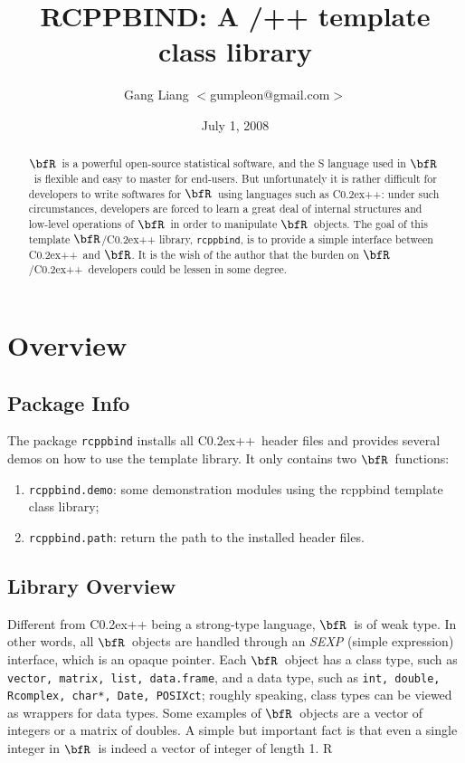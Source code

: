\documentclass{article}
\title{RCPPBIND: A \R/\C++ template class library}
\date{July 1, 2008}
\author{Gang Liang $<$gumpleon@gmail.com$>$}
\def\C++{C{\raise 0.2ex\hbox{++}}}
\newcommand{\R}{$\bfR$}
\begin{document}
\maketitle

\begin{abstract}%
  \R\ is a powerful open-source statistical software, and
  the S language used in \R\ is flexible and easy to master
  for end-users. But unfortunately it is rather difficult for
  developers to write softwares for \R\ using languages
  such as \C++: under such circumstances, developers are
  forced to learn a great deal of internal structures and
  low-level operations of \R\ in order to manipulate \R\ objects.  The
  goal of this template \R/\C++ library, \texttt{rcppbind}, is to
  provide a simple interface between \C++\ and \R. It is the
  wish of the author that the burden on \R/\C++\ developers could be
  lessen in some degree.%
\end{abstract}

\section{Overview}

\subsection{Package Info}

The package \texttt{rcppbind} installs all \C++\ header files
and provides several demos on how to use the template
library. It only contains two \R\ functions:
\begin{enumerate}
  \item \texttt{rcppbind.demo}: some demonstration
    modules using the rcppbind template class library;
  \item \texttt{rcppbind.path}: return the path to the
    installed header files.
\end{enumerate}

\subsection{Library Overview}

Different from \C++ being a strong-type language, \R\ is of
weak type. In other words, all \R\ objects are handled
through an \textsl{SEXP} (simple expression) interface, which
is an opaque pointer. Each \R\ object has a class type, such
as \texttt{vector, matrix, list, data.frame}, and a data
type, such as \texttt{int, double, Rcomplex, char*, Date,
POSIXct}; roughly speaking, class types can be viewed as
wrappers for data types. Some examples of \R\ objects are a
vector of integers or a matrix of doubles. A simple but
important fact is that even a single integer in \R\ is indeed
a vector of integer of length 1.  R
\end{document}
